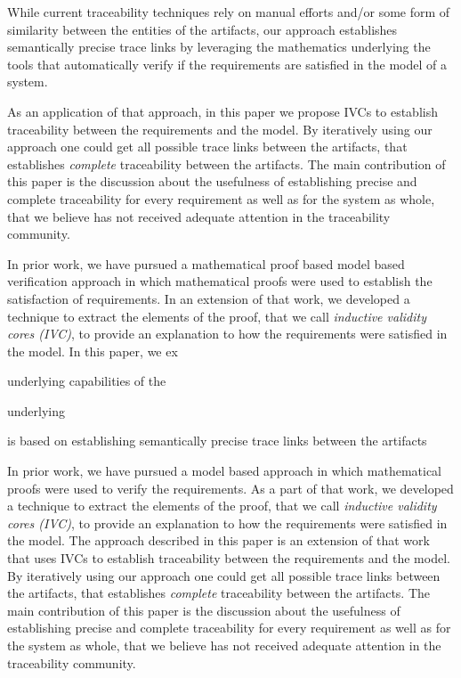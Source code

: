 While current traceability techniques rely on manual efforts and/or some form of similarity between the entities of the artifacts, our approach establishes semantically precise trace links by leveraging the mathematics underlying the tools that automatically verify if the requirements are satisfied in the model of a system.




 As an application of that approach, in this paper we propose  IVCs to establish traceability between the requirements and the model. By iteratively using our approach one could get all possible trace links between the artifacts, that establishes \emph{complete} traceability between the artifacts. The main contribution of this paper is the discussion about the usefulness of establishing precise and complete traceability for every requirement as well as for the system as whole, that we believe has not received adequate attention in the traceability community.

In prior work, we have pursued a mathematical proof based model based verification approach in which mathematical proofs were used to establish the satisfaction of requirements. In an extension of that work, we developed a technique to extract the elements of the proof, that we call {\em inductive validity cores (IVC)}, to provide an explanation to how the requirements were satisfied in the model. In this paper, we ex

 underlying capabilities of the

underlying

is based on establishing semantically precise trace links between the artifacts

In prior work, we have pursued a model based approach in which mathematical proofs were used to verify the requirements. As a part of that work, we developed a technique to extract the elements of the proof, that we call {\em inductive validity cores (IVC)}, to provide an explanation to how the requirements were satisfied in the model. The approach described in this paper is an extension of that work that uses IVCs to establish traceability between the requirements and the model. By iteratively using our approach one could get all possible trace links between the artifacts, that establishes \emph{complete} traceability between the artifacts. The main contribution of this paper is the discussion about the usefulness of establishing precise and complete traceability for every requirement as well as for the system as whole, that we believe has not received adequate attention in the traceability community.


